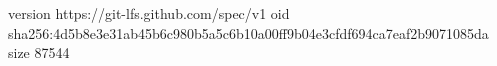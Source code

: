 version https://git-lfs.github.com/spec/v1
oid sha256:4d5b8e3e31ab45b6c980b5a5c6b10a00ff9b04e3cfdf694ca7eaf2b9071085da
size 87544
